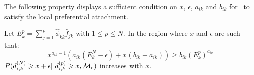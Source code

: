 The following property displays a sufficient condition on $x$, $\epsilon$, $a_{ik}$ and $b_{ik}$ for \imb\ to satisfy the local preferential attachment.

\begin{proposition}\label{prop:IMBlocal}
Let $E_k^p = \sum_{j=1}^p \hat\phi_{kk} \hat{f}_{jk}$ with $1\leq p \leq N$. In the region where $x$ and $\epsilon$ are such that:
\begin{equation*}
x^{a_{ik}-1}\left(a_{ik}(E_k^N-\epsilon) + x(b_{ik} - a_{ik}) \right) \geq b_{ik}(E_k^p)^{a_{ik}}
\end{equation*}
$P(d_{i,k}^{(N)} \geq x+\epsilon | d_{i,k}^{(p)} \geq x,\M_e)$ increases with $x$.
\end{proposition}


